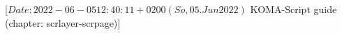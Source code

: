 %
%
%
%
%
%
%

%
                 [$Date: 2022-06-05 12:40:11 +0200 (So, 05. Jun 2022) $
                  KOMA-Script guide (chapter: scrlayer-scrpage)]

